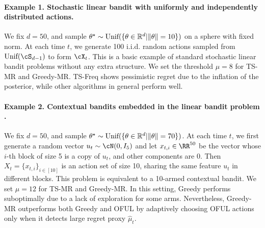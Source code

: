 \paragraph{Example 1. Stochastic linear bandit with uniformly and independently distributed actions.} We fix $d = 50$, and sample $\theta^\star\sim\text{Unif}(\{\theta \in \mathbb{R}^d|\|\theta\|= 10\}) $ on a sphere with fixed norm. At each time $t$, we generate 100 i.i.d. random actions sampled from $\text{Unif}(\cS_{d-1})$ to form $\cX_t$. This is a basic example of standard stochastic linear bandit problems without any extra structure. We set the threshold  $\mu = 8$ for TS-MR and Greedy-MR. TS-Freq shows pessimistic regret due to the inflation of the posterior, while other algorithms in general perform well. 



\paragraph{Example 2. Contextual bandits embedded in the linear bandit problem  \citep{abbasi2013online}.} We fix $d = 50$, and sample $\theta^\star\sim\text{Unif}(\{\theta \in \mathbb{R}^d|\|\theta\|= 70\}) $. At each time $t$, we first  generate a random vector $u_t \sim \cN(0, I_5)$ and let $x_{t,i}\in \RR^{50}$ be the vector whose $i$-th block of size 5 is a  copy of $u_t$, and other components are 0. Then $X_t = \{x_{t,i}\}_{i\in [10] }$ is an action set of size 10, sharing the same feature $u_t$ in different blocks. This problem is equivalent to a 10-armed contextual bandit. We set $\mu = 12$ for TS-MR and Greedy-MR.  In this setting, Greedy performs suboptimally due to a lack of exploration for some arms. Nevertheless, Greedy-MR outperforms both Greedy and OFUL by adaptively choosing OFUL actions only when it detects large regret proxy $\hat{\mu}_t$.  



